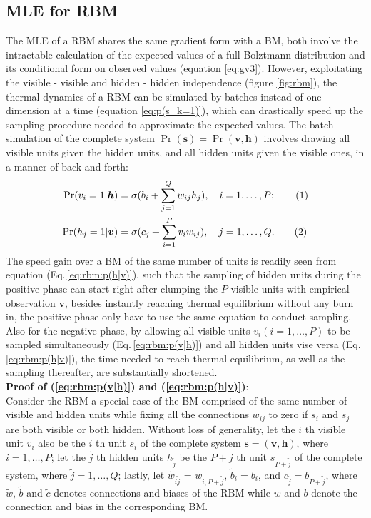 \documentclass[11pt]{article}
\newcommand\numberthis{\addtocounter{equation}{1}\tag{\theequation}}
\newcommand{\vh}{\boldsymbol{h}}
\newcommand{\vv}{\boldsymbol{v}}
\newcommand{\vs}{\boldsymbol{s}}
\begin{document}
{\subsection{MLE for RBM}
The MLE of a RBM shares the same gradient form with a BM, both involve the intractable calculation of the expected values of a full Bolztmann distribution and its conditional form on observed values (equation \ref{eq:gv3}). However, exploitating the visible - visible and hidden - hidden independence (figure \ref{fig:rbm}), the thermal dynamics of a RBM can be simulated by batches instead of one dimension at a time (equation \ref{eq:p(s_k=1)}), which can drastically speed up the sampling procedure needed to approximate the expected values. The batch simulation of the complete system $\Pr(\vs)=\Pr(\vv, \vh)$ involves drawing all visible units given the hidden units, and all hidden units given the visible ones, in a manner of back and forth:
\begin{align*}
  \Pr(v_i=1|\vh) & = \sigma(b_i + \sum_{j=1}^Q{w_{ij} h_j}), \quad i = 1, \dots, P; \numberthis \label{eq:rbm:p(v|h)} \\
  \Pr(h_j=1|\vv) & = \sigma(c_j + \sum_{i=1}^P{v_i w_{ij}}), \quad j = 1, \dots, Q. \numberthis \label{eq:rbm:p(h|v)}
\end{align*}
The speed gain over a BM of the same number of units is readily seen from equation (Eq.\,\ref{eq:rbm:p(h|v)}), such that the sampling of hidden units during the positive phase can start right after clumping the $P$ visible units with empirical observation $\vv$, besides instantly reaching thermal equilibrium without any burn in, the positive phase only have to use the same equation to conduct sampling. Also for the negative phase, by allowing all visible units $v_i (i=1, \dots, P)$ to be sampled simultaneously (Eq.\,\ref{eq:rbm:p(v|h)}) and all hidden units vise versa (Eq.\,\ref{eq:rbm:p(h|v)}), the time needed to reach thermal equilibrium, as well as the sampling thereafter, are substantially shortened. \\
\textbf{Proof of (\ref{eq:rbm:p(v|h)}) and (\ref{eq:rbm:p(h|v)})}: \\
\newcommand{\jt}{\tilde{j}}
\newcommand{\wt}{\tilde{w}}
\newcommand{\bt}{\tilde{b}}
\newcommand{\ct}{\tilde{c}}
Consider the RBM a special case of the BM comprised of the same number of visible and hidden units while fixing all the connections $w_{ij}$ to zero if $s_i$ and $s_j$ are both visible or both hidden. Without loss of generality, let the $i$ th visible unit $v_i$ also be the $i$ th unit $s_i$ of the complete system $\vs=(\vv, \vh)$, where $i=1, \dots, P$; let the $\jt$ th hidden units $h_{\jt}$ be the $P+\jt$ th unit $s_{P+\jt}$ of the complete system, where $\jt=1, \dots, Q$; lastly, let $\wt_{i\jt}$ = $w_{i,P+\jt}$, $\bt_i = b_i$, and $\ct_{\jt} = b_{P+\jt}$, where $\wt$, $\bt$ and $\ct$ denotes connections and biases of the RBM while $w$ and $b$ denote the connection and bias in the corresponding BM.
}
\end{document}
